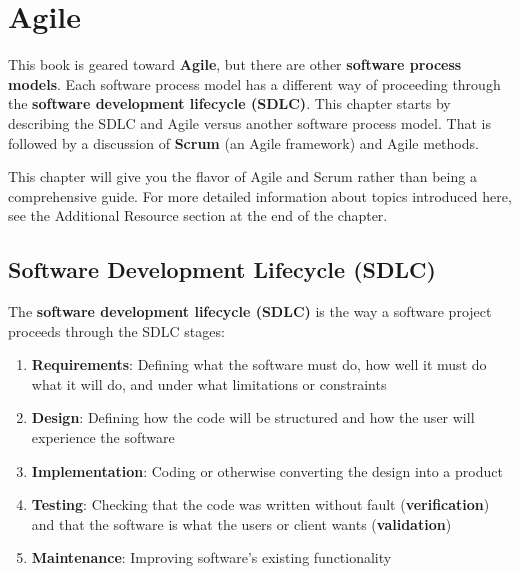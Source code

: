 \chapter{Agile}


This book is geared toward \textbf{Agile}\marginpar{\agileDef\margindivider}, but there are other \textbf{software process models}\marginpar{\softwareProcessModelDef}. Each software process model has a different way of proceeding through the \textbf{software development lifecycle (SDLC)}. This chapter starts by describing the SDLC and Agile versus another software process model. That is followed by a discussion of \textbf{Scrum} (an Agile framework) and Agile methods.

This chapter will give you the flavor of Agile and Scrum rather than being a comprehensive guide. For more detailed information about topics introduced here, see the Additional Resource section at the end of the chapter. 

\section{Software Development Lifecycle (SDLC)}

\marginpar{\scrumDef\margindivider}\marginpar{\sdlcDef\margindivider}\marginpar{\verificationDef\margindivider}\marginpar{\validationDef\margindivider}\marginpar{\maintenanceDef\margindivider}\marginpar{\incrementDef\margindivider}\marginpar{\waterfallDef}The \textbf{software development lifecycle (SDLC)} is the way a software project proceeds through the SDLC stages: 
\begin{enumerate}
\item \textbf{Requirements}: Defining what the software must do, how well it must do what it will do, and under what limitations or constraints
\item \textbf{Design}: Defining how the code will be structured and how the user will experience the software
\item \textbf{Implementation}: Coding or otherwise converting the design into a product
\item \textbf{Testing}: Checking that the code was written without fault (\textbf{verification}) and that the software is what the users or client wants (\textbf{validation})
\item \textbf{Maintenance}: Improving software's existing functionality
\end{enumerate}

